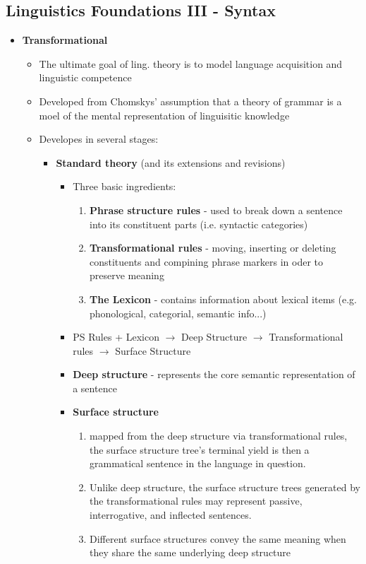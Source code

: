 \documentclass[11pt]{article}
\newenvironment{itemise}{
\begin{itemize}
  \setlength{\itemsep}{1pt}
  \setlength{\parskip}{0pt}
  \setlength{\parsep}{0pt}
}{\end{itemize}}
\begin{document}
\subsection{Linguistics Foundations III - Syntax}
\begin{itemise}
 \item {\bf Transformational}
  \begin{itemise}
   \item The ultimate goal of ling. theory is to model language acquisition and linguistic competence
   \item Developed from Chomskys' assumption that a theory of grammar is a moel of the mental representation of linguisitic knowledge
   \item Developes in several stages:
    \begin{itemise}
     \item {\bf Standard theory} (and its extensions and revisions)
      \begin{itemise}
       \item Three basic ingredients:
	\begin{enumerate}
	 \item {\bf Phrase structure rules} - used to break down a sentence into its constituent parts (i.e. syntactic categories)
	 \item {\bf Transformational rules} - moving, inserting or deleting constituents and compining phrase markers in oder to preserve meaning
	 \item {\bf The Lexicon} - contains information about lexical items (e.g. phonological, categorial, semantic info...)
	\end{enumerate}
       \item PS Rules + Lexicon $\rightarrow$ Deep Structure $\rightarrow$ Transformational rules $\rightarrow$ Surface Structure
       \item {\bf Deep structure} - represents the core semantic representation of a sentence
       \item {\bf Surface structure}
	\begin{enumerate}
	 \item mapped from the deep structure via transformational rules, the surface structure tree's terminal yield is then a grammatical sentence in the language in question. 
	 \item Unlike deep structure, the surface structure trees generated by the transformational rules may represent passive, interrogative, and inflected sentences.
	 \item Different surface structures convey the same meaning when they share the same underlying deep structure

\end{enumerate}
\end{itemise}
\end{itemise}
\end{itemise}
\end{itemise}
\end{document}

